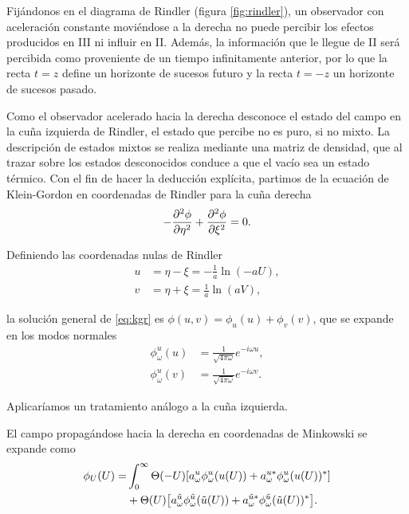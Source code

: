 Fijándonos en el diagrama de Rindler (figura \ref{fig:rindler}),
un observador con aceleración constante moviéndose a la derecha no puede percibir los 
efectos producidos  en III ni influir en II. 
Además, la información que le llegue de II será percibida como proveniente de un tiempo
infinitamente anterior, por lo que la recta $t=z$ define un horizonte de sucesos futuro y 
la recta $t=-z$ un horizonte de sucesos pasado.

Como el observador acelerado hacia la derecha desconoce el estado del campo en la 
cuña izquierda de Rindler, el estado que percibe no es puro, si no mixto.
La descripción de estados mixtos se realiza mediante una matriz de densidad, que al trazar
sobre los estados desconocidos conduce a que el vacío sea un estado térmico.
Con el fin de hacer la deducción explícita, partimos de la ecuación de Klein-Gordon en
coordenadas de Rindler para la cuña derecha
\begin{equation}
  -\pdv[2]{\phi}{\eta}+\pdv[2]{\phi}{\xi} = 0.
  \label{eq:kgr}
\end{equation}

Definiendo las coordenadas nulas de Rindler 
  \begin{align}
    u&=\eta-\xi=-\frac{1}{a}\ln(-aU)\label{eq:coorind} ,\\
    v&=\eta+\xi=\frac{1}{a}\ln(aV), 
  \end{align}

la solución general de \ref{eq:kgr} es $\phi(u,v)=\phi_u(u)+\phi_v(v)$, que se expande en los
modos normales
\begin{equation}
  \begin{aligned}
    \phi^u_\omega(u) &=\frac{1}{\sqrt{4\pi\omega}}e^{-i\omega u},\\
    \phi^u_\omega(v) &=\frac{1}{\sqrt{4\pi\omega}}e^{-i\omega v}.
  \end{aligned}
\end{equation}

Aplicaríamos un tratamiento análogo a la cuña izquierda.

El campo propagándose hacia la derecha en coordenadas de Minkowski se expande como
\begin{equation}
  \begin{aligned}
    \phi_U(U)=&\int_0^\infty \Theta(-U)\qty[a^u_\omega \phi^u_\omega(u(U))+a_\omega^{u*}\phi_\omega^u(u(U))^*] \\
    &+\Theta(U)\qty[a^{\tilde u}_\omega \phi^{\tilde u}_\omega(\tilde u(U))+a_\omega^{\tilde u*}\phi_\omega^{\tilde u}(\tilde u(U))^*].
  \end{aligned}
\end{equation}


